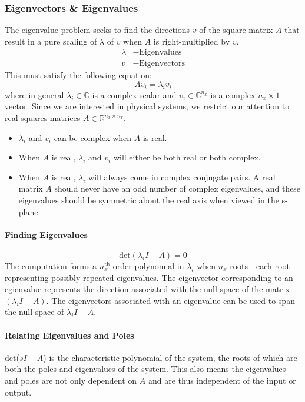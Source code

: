 \documentclass[../notes.tex]{subfiles}
\begin{document}
\subsubsection{Eigenvectors \& Eigenvalues} \label{sec:eig}
The eigenvalue problem seeks to find the directions $v$ of the square matrix $A$ that result in a pure scaling of $\lambda$ of $v$ when $A$ is right-multiplied by $v$.
\begin{align*}
    \lambda &- \text{Eigenvalues} \\
    v &- \text{Eigenvectors}  
\end{align*}
This must satisfy the following equation:
\begin{equation}
    Av_i = \lambda_i v_i
\end{equation}
where in general $\lambda_i \in \mathbb{C}$ is a complex scalar and $v_i \in \mathbb{C}^{n_x}$ is a complex $n_x \times 1$ vector. Since we are interested in physical systems, we restrict our attention to real squares matrices $A\in \mathbb{R}^{n_x \times n_x}$.
\begin{itemize}
    \item $\lambda_i$ and $v_i$ can be complex when $A$ is real.
    \item When $A$ is real, $\lambda_i$ and $v_i$ will either be both real or both complex.
    \item When $A$ is real, $\lambda_i$ will always come in complex conjugate pairs. A real matrix $A$ should never have an odd number of complex eigenvalues, and these eigenvalues should be symmetric about the real axis when viewed in the s-plane.
\end{itemize}
\paragraph{Finding Eigenvalues}
\begin{equation*}
    \text{det}(\lambda_i I - A) = 0
\end{equation*}
The computation forms a $n_x^{\text{th}}$-order polynomial in $\lambda_i$ when $n_x$ roots - each root representing possibly repeated eigenvalues. The eigenvector corresponding to an egienvalue represents the direction associated with the null-space of the matrix $(\lambda_i I -A)$. The eigenvectors associated with an eigenvalue can be used to span the null space of $\lambda_i I - A$.

\paragraph{Relating Eigenvalues and Poles}
det($s I - A$) is the characteristic polynomial of the system, the roots of which are both the poles and eigenvalues of the system. This also means the eigenvalues and poles are not only dependent on $A$ and are thus independent of the input or output.
\end{document}
